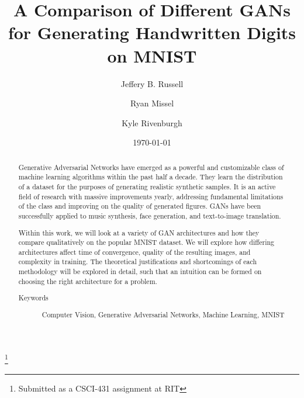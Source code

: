 \documentclass[12pt,
 reprint,
nofootinbib,
 amsmath,amssymb,
 aps,
floatfix,
]{revtex4-2}
\begin{document}

\title{A Comparison of Different GANs for Generating Handwritten Digits on MNIST}
\thanks{Submitted as a CSCI-431 assignment at RIT}%

\author{Jeffery B. Russell}
%

\author{Ryan Missel}
%


\author{Kyle Rivenburgh}
%

\date{\today}%

\begin{abstract}
Generative Adversarial Networks have emerged as a powerful and customizable class of machine learning algorithms within the past half a decade. They learn the distribution of a dataset for the purposes of generating realistic synthetic samples. It is an active field of research with massive improvements yearly, addressing fundamental limitations of the class and improving on the quality of generated figures. GANs have been successfully applied to music synthesis, face generation, and text-to-image translation.

Within this work, we will look at a variety of GAN architectures and how they compare qualitatively on the popular MNIST dataset. We will explore how differing architectures affect time of convergence, quality of the resulting images, and complexity in training. The theoretical justifications and shortcomings of each methodology will be explored in detail, such that an intuition can be formed on choosing the right architecture for a problem.

\begin{description}
\item[Keywords]
Computer Vision, Generative Adversarial Networks, Machine Learning, MNIST
\end{description}

\end{abstract}
\maketitle
\end{document}
